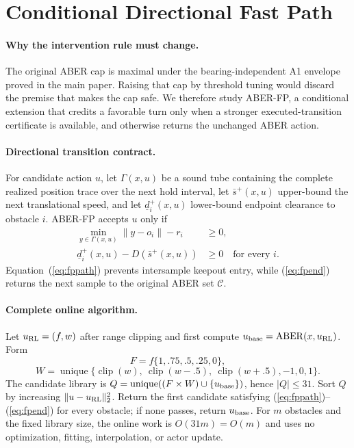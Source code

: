 \section{Conditional Directional Fast Path}

\paragraph{Why the intervention rule must change.}
The original ABER cap is maximal under the bearing-independent A1 envelope
proved in the main paper.  Raising that cap by threshold tuning would discard
the premise that makes the cap safe.  We therefore study ABER-FP, a
conditional extension that credits a favorable turn only when a stronger
executed-transition certificate is available, and otherwise returns the
unchanged ABER action.

\paragraph{Directional transition contract.}
For candidate action $u$, let $\Gamma(x,u)$ be a sound tube containing the
complete realized position trace over the next hold interval, let
$\bar s^+(x,u)$ upper-bound the next translational speed, and let
$\underline d_i^+(x,u)$ lower-bound endpoint clearance to obstacle $i$.
ABER-FP accepts $u$ only if
\begin{align}
 \min_{y\in\Gamma(x,u)}\|y-o_i\|-r_i &\ge 0,
 \label{eq:fppath}\\
 \underline d_i^+(x,u)-D(\bar s^+(x,u)) &\ge 0
 \quad\text{for every }i.
 \label{eq:fpend}
\end{align}
Equation~(\ref{eq:fppath}) prevents intersample keepout entry, while
(\ref{eq:fpend}) returns the next sample to the original ABER set
$\mathcal C$.

\paragraph{Complete online algorithm.}
Let $u_{\rm RL}=(f,w)$ after range clipping and first compute
$u_{\rm base}=\operatorname{ABER}(x,u_{\rm RL})$.  Form
\[
 F=f\{1,.75,.5,.25,0\},
\]
\[
 W=\operatorname{unique}\{\operatorname{clip}(w),\
 \operatorname{clip}(w-.5),\
 \operatorname{clip}(w+.5),-1,0,1\}.
\]
The candidate library is
$Q=\operatorname{unique}((F\times W)\cup\{u_{\rm base}\})$, hence
$|Q|\le31$.  Sort $Q$ by increasing
$\|u-u_{\rm RL}\|_2^2$.  Return the first candidate satisfying
(\ref{eq:fppath})--(\ref{eq:fpend}) for every obstacle; if none passes,
return $u_{\rm base}$.  For $m$ obstacles and the fixed library size, the
online work is $O(31m)=O(m)$ and uses no optimization, fitting, interpolation,
or actor update.

